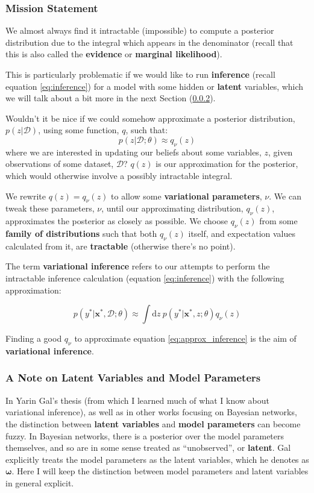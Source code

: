 \documentclass[]{article}
\begin{document}
\subsubsection{Mission Statement}
We almost always find it intractable (impossible) to compute a posterior distribution due to the integral which appears in the denominator (recall that this is also called the \textbf{evidence} or \textbf{marginal likelihood}).

This is particularly problematic if we would like to run \textbf{inference} (recall equation \ref{eq:inference}) for a model with some hidden or \textbf{latent} variables, which we will talk about a bit more in the next Section (\ref{section:latent_variables}).

Wouldn't it be nice if we could somehow approximate a posterior distribution, $p(z|\mathcal{D})$, using some function, $q$, such that:
\begin{equation}
    p(z | \mathcal{{D}};\theta) \approx q_\nu(z)    
\end{equation}
where we are interested in updating our beliefs about some variables, $z$, given observations of some dataset, $\mathcal{D}$? $q(z)$ is our approximation for the posterior, which would otherwise involve a possibly intractable integral.

We rewrite $q(z) = q_\nu(z)$ to allow some \textbf{variational parameters}, $\nu$. We can tweak these parameters, $\nu$, until our approximating distribution, $q_\nu (z)$, approximates the posterior as closely as possible. We choose $q_\nu (z)$ from some \textbf{family of distributions} such that both $q_\nu (z)$ itself, and expectation values calculated from it, are \textbf{tractable} (otherwise there's no point).

The term \textbf{variational inference} refers to our attempts to perform the intractable inference calculation (equation \ref{eq:inference}) with the following approximation: 

\begin{equation}\label{eq:approx_inference}
    p (y^{*} | \textbf{x}^*, \mathcal{D};\theta) \approx \int \text{d}z~ p (y^*|\textbf{x}^*, z;\theta)q_\nu (z) 
\end{equation}

Finding a good $q_\nu$ to approximate equation \ref{eq:approx_inference} is the aim of \textbf{variational inference}.

\subsubsection{A Note on Latent Variables and Model Parameters}\label{section:latent_variables}
In Yarin Gal's thesis \cite{Gal2016} (from which I learned much of what I know about variational inference), as well as in other works focusing on Bayesian networks, the distinction between \textbf{latent variables} and \textbf{model parameters} can become fuzzy. In Bayesian networks, there is a posterior over the model parameters themselves, and so are in some sense treated as ``unobserved'', or \textbf{latent}. Gal explicitly treats the model parameters as the latent variables, which he denotes as $\boldsymbol{\omega}$. Here I will keep the distinction between model parameters and latent variables in general explicit.
\end{document}
